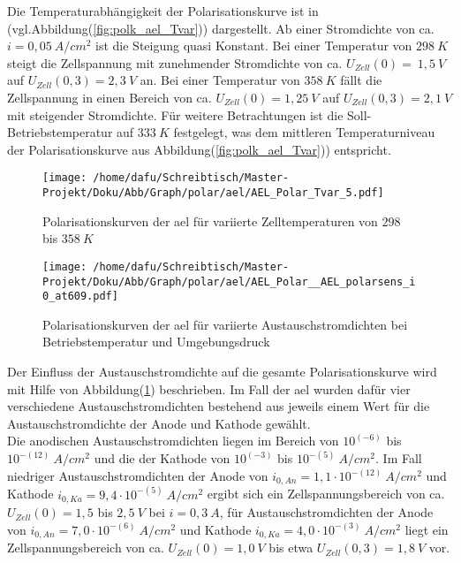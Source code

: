 \documentclass[onecolumn,10pt,titlepage]{article}
\begin{document}
Die Temperaturabhängigkeit der Polarisationskurve ist in (vgl.Abbildung(\ref{fig:polk_ael_Tvar})) dargestellt. Ab einer Stromdichte von ca. $i=0,05~A/cm^2$ ist die Steigung quasi Konstant. Bei einer Temperatur von $298~K$ steigt die Zellspannung mit zunehmender Stromdichte von ca. $U_{Zell}(0)=~1,5~V$ auf $U_{Zell}(0,3)=2,3~V$ an. Bei einer Temperatur von $358~K$ fällt die Zellspannung in einen Bereich von ca. $U_{Zell}(0)=1,25~V$ auf $U_{Zell}(0,3)=2,1~V$ mit steigender Stromdichte.
Für weitere Betrachtungen ist die Soll-Betriebstemperatur auf $333~K$ festgelegt, was dem mittleren Temperaturniveau der Polarisationskurve aus Abbildung(\ref{fig:polk_ael_Tvar})) entspricht.
\begin{figure}[H]
	\centering
	\begin{minipage}[t]{0.49\textwidth}
		\texttt{[image: /home/dafu/Schreibtisch/Master-Projekt/Doku/Abb/Graph/polar/ael/AEL\_Polar\_Tvar\_5.pdf]}

		\caption[Polarisationskurven der \gls{ael} für variierte Zelltemperaturen]{Polarisationskurven der \gls{ael} für variierte Zelltemperaturen von $298$ bis $358~K$}
		\label{fig:polk_ael_Tvar}
	\end{minipage}
	\hfill
	\begin{minipage}[t]{0.49\textwidth}
		\texttt{[image: /home/dafu/Schreibtisch/Master-Projekt/Doku/Abb/Graph/polar/ael/AEL\_Polar\_\_AEL\_polarsens\_i0\_at609.pdf]}

		\caption[Polarisationskurven der \gls{ael} für variierte Austauschstromdichten]{Polarisationskurven der \gls{ael} für variierte Austauschstromdichten bei Betriebstemperatur und Umgebungsdruck}
		\label{fig:polk_ael_i0var}
	\end{minipage}
\end{figure}
Der Einfluss der Austauschstromdichte auf die gesamte Polarisationskurve wird mit Hilfe von Abbildung(\ref{fig:polk_ael_i0var}) beschrieben. Im Fall der \gls{ael} wurden dafür vier verschiedene Austauschstromdichten bestehend aus jeweils einem Wert für die Austauschstromdichte der Anode und Kathode gewählt.\\ Die anodischen Austauschstromdichten liegen im Bereich von $10^{(-6)}$ bis $10^{-(12)}~A/cm^2$ und die der Kathode von $10^{(-3)}$ bis $10^{-(5)}~A/cm^2$. Im Fall niedriger Austauschstromdichten der Anode von $i_{0,An}=1,1 \cdot10^{-(12)}~A/cm^2$ und Kathode $i_{0,Ka}=9,4 \cdot10^{-(5)}~A/cm^2$ ergibt sich ein Zellspannungsbereich von ca. $U_{Zell}(0)=1,5$ bis $2,5~V$ bei $i=0,3~A$, für Austauschstromdichten der Anode von $i_{0,An}=7,0 \cdot10^{-(6)}~A/cm^2$ und Kathode $i_{0,Ka}=4,0 \cdot10^{-(3)}~A/cm^2$ liegt ein Zellspannungsbereich von ca. $U_{Zell}(0)=1,0~V$ bis etwa $U_{Zell}(0,3)=1,8~V$ vor.
\end{document}

